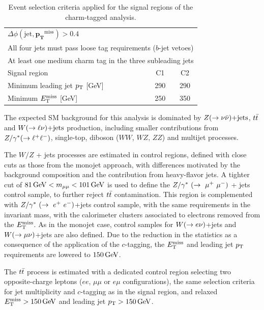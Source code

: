 \begin{table}[!t]
\begin{center}
\begin{small}
\begin{tabular*}{\textwidth}{@{\extracolsep{\fill}}lcc}
        \multicolumn{3}{l}{$\Delta\phi(\text{jet}, \mathbf{p_{T}}^\text{miss}) > 0.4$}\\
        \multicolumn{3}{l}{All four jets must pass loose tag requirements ($b$-jet vetoes)}\\
        \multicolumn{3}{l}{At least one medium charm tag in the three subleading jets}\\\hline
        Signal region        & C1 & C2   \\
        Minimum leading jet $p_{\mathrm{T}}$ [GeV] & 290 & 290   \\
        Minimum $E_{\mathrm{T}}^{\mathrm{miss}}$ [GeV] & 250 & 350  \\ \hline\hline
      \end{tabular*}
    \end{small}
  \end{center}
  \caption[Event selection criteria applied for the signal regions of the charm-tagged analysis.]{Event selection criteria applied for the signal regions of the charm-tagged analysis.}
  \label{tab:CharmTaggedSignalRegionCuts}
\end{table}

The expected SM background for this analysis is dominated by $Z(\rightarrow \nu \bar{\nu})\text{+jets}$, $t\bar{t}$ and $W(\rightarrow \ell \nu)\text{+jets}$ production, including smaller contributions from $Z/\gamma^*(\rightarrow\ell^+\ell^-)$, single-top, diboson ($WW$, $WZ$, $ZZ$) and multijet processes.

The $W/Z$ + jets processes are estimated in control regions, defined with close cuts as those from the monojet approach, with differences motivated by the background composition and the contribution from heavy-flavor jets.
A tighter cut of $\unit[81]{GeV} < m_{\mu\mu} < \unit[101]{GeV}$ is used to define the $Z/\gamma^*~(\rightarrow~\mu^+~\mu^-)$ + jets control sample, to further reject $t\bar{t}$ contamination.
This region is complemented with $Z/\gamma^*~(\rightarrow~e^+~e^-)$+jets control sample, with the same requirements in the invariant mass, with the calorimeter clusters associated to electrons removed from the $E_{\mathrm{T}}^{\mathrm{miss}}$.
As in the monojet case, control samples for $W(\rightarrow e \nu)$+jets and $W(\rightarrow \mu \nu)$+jets are also defined.
Due to the reduction in the statistics as a consequence of the application of the $c$-tagging, the $E_{\mathrm{T}}^{\mathrm{miss}}$ and leading jet $p_{\mathrm{T}}$ requirements are lowered to $\unit[150]{GeV}$.

The $t\bar{t}$ process is estimated with a dedicated control region selecting two opposite-charge leptons ($ee$, $\mu\mu$ or $e\mu$ configurations), the same selection criteria for jet multiplicity and $c$-tagging as in the signal region, and relaxed $\met>\unit[150]{GeV}$ and leading jet $\pt>\unit[150]{GeV}$.

